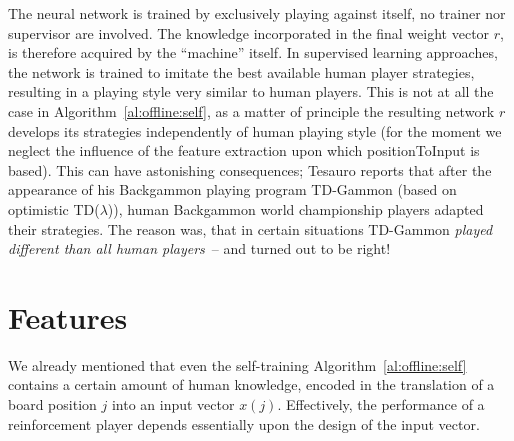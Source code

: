 The neural network is trained by exclusively playing against itself, no trainer nor supervisor are involved. The knowledge incorporated in the final weight vector $r$, is therefore acquired by the ``machine'' itself.  In supervised learning approaches, the network is trained to imitate the best available human player strategies, resulting in a playing style very similar to human players. This is not at all the case in Algorithm~\ref{al:offline:self}, as a matter of principle the resulting network $r$ develops its strategies  independently of human playing style (for the moment we neglect the influence of the feature extraction upon which {\al positionToInput} is based). This can have astonishing consequences; Tesauro \cite{lig*Tesauro95} reports that after the appearance of his Backgammon playing program TD-Gammon (based on optimistic TD($\lambda$)), human Backgammon world championship players adapted their strategies. The reason was, that in certain situations TD-Gammon \emph{played different than all human players}~-- and turned out to be right!







\section{Features} \label{sec:impl:features}
We already mentioned that even the self-training Algorithm~\ref{al:offline:self} contains a certain amount of human knowledge, encoded in the translation of a board position $j$ into an input vector $x(j)$. Effectively, the performance of a reinforcement player depends essentially upon the design of the input vector. 

